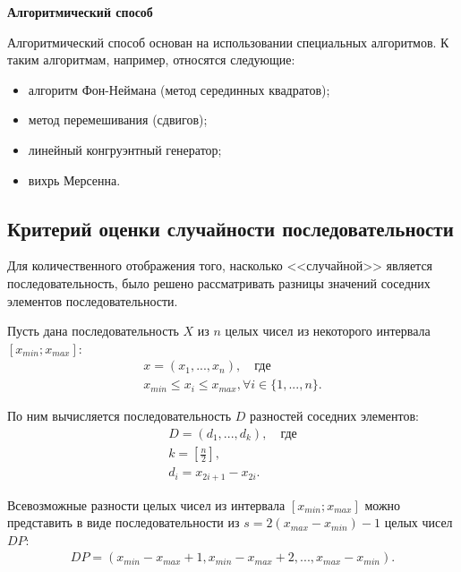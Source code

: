 \documentclass[14pt, a4paper]{extarticle}
\begin{document}
\textbf{Алгоритмический способ}

Алгоритмический способ основан на использовании специальных алгоритмов. К таким алгоритмам, например, относятся следующие:

\begin{itemize}
	\item алгоритм Фон-Неймана (метод серединных квадратов);
	\item метод перемешивания (сдвигов);
	\item линейный конгруэнтный генератор;
	\item вихрь Мерсенна.
\end{itemize}



\subsection{Критерий оценки случайности последовательности}

Для количественного отображения того, насколько <<случайной>> является последовательность, было решено рассматривать разницы значений соседних элементов последовательности. 

Пусть дана последовательность $X$ из $n$ целых чисел из некоторого интервала $[x_{min}; x_{max}]$:
\begin{equation}
	\begin{gathered}
		x = \left(x_1, ..., x_n\right), \quad \text{где} \\
		x_{min} \leq x_i \leq x_{max}, \forall i \in \{1, ..., n\}.
	\end{gathered}
\end{equation}

По ним вычисляется последовательность $D$ разностей соседних элементов:
\begin{equation}
	\begin{gathered}
	D = \left(d_1, ..., d_k\right), \quad \text{где} \\
	k = \left[\frac{n}{2}\right],\\
	d_i = x_{2i + 1} - x_{2i}.
	\end{gathered}
\end{equation}

Всевозможные разности целых чисел из интервала $[x_{min}; x_{max}]$ можно представить в виде последовательности из $s=2\left(x_{max} - x_{min}\right) - 1$ целых чисел $DP$:
\begin{equation}
	\begin{gathered}
		DP = \left(x_{min} - x_{max} + 1, x_{min} - x_{max} + 2, ..., x_{max} - x_{min}\right).
	\end{gathered}
\end{equation}
\end{document}

